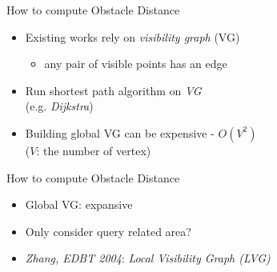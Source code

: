 \begin{frame}{How to compute Obstacle Distance}
\begin{minipage}{.4\textwidth}
\begin{itemize}
\item \small Existing works rely on \textit{visibility graph} (VG)
    \begin{itemize}
        \item \small any pair of visible points has an edge
    \end{itemize}
\item \small Run shortest path algorithm on \textit{VG}\\
             (\tiny{e.g. \textit{Dijkstra}})
\item \small {Building global VG can be expensive - $O(V^2)$\\
            (\tiny{$V$: the number of vertex}})
\end{itemize}
\end{minipage}%
\begin{minipage}{.6\textwidth}
\begin{adjustbox}{max totalsize={.9\textwidth}{.9\textheight}, right}
\end{adjustbox}
\end{minipage}
\end{frame}

\begin{frame}{How to compute Obstacle Distance}
\begin{minipage}{.4\textwidth}
\begin{itemize}
\item \small Global VG: expansive
\item \small Only consider query related area?
\item \small {\textit{Zhang, EDBT 2004}: \textit{Local Visibility Graph (LVG)}}
\end{itemize}
\end{minipage}%
\begin{minipage}{.6\textwidth}
\begin{adjustbox}{max totalsize={.9\textwidth}{.9\textheight}, right}
\end{adjustbox}
\end{minipage}
\end{frame}

